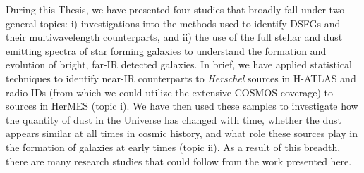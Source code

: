 During this Thesis, we have presented four studies that broadly fall under two general topics: i) investigations into the methods used to identify DSFGs and their multiwavelength counterparts, and ii) the use of the full stellar and dust emitting spectra of star forming galaxies to understand the formation and evolution of bright, far-IR detected galaxies. In brief, we have applied statistical techniques to identify near-IR counterparts to \textit{Herschel} sources in H-ATLAS and radio IDs (from which we could utilize the extensive COSMOS coverage) to sources in HerMES (topic i). We have then used these samples to investigate how the quantity of dust in the Universe has changed with time, whether the dust appears similar at all times in cosmic history, and what role these sources play in the formation of galaxies at early times (topic ii). As a result of this breadth, there are many research studies that could follow from the work presented here.

